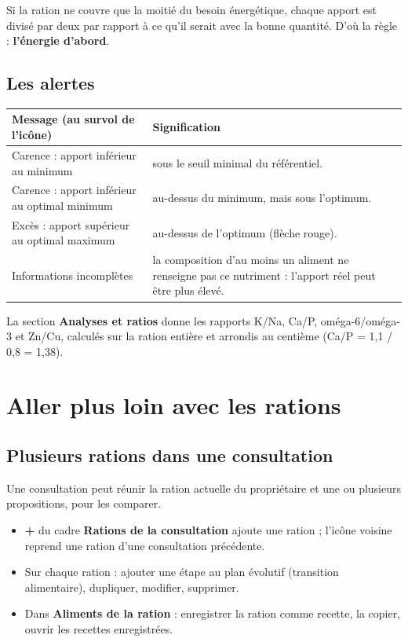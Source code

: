 \documentclass[11pt,a4paper]{article}
\newcommand{\ui}[1]{\textsf{\textbf{#1}}}
\begin{document}
\begin{aretenir}
Si la ration ne couvre que la moitié du besoin énergétique, chaque apport est divisé par deux
par rapport à ce qu'il serait avec la bonne quantité. D'où la règle : \textbf{l'énergie
d'abord}.
\end{aretenir}

\subsection{Les alertes}

\begin{tabularx}{\linewidth}{@{}>{\raggedright\arraybackslash}p{6.2cm} X@{}}
\toprule
\textbf{Message (au survol de l'icône)} & \textbf{Signification} \\
\midrule
Carence : apport inférieur au minimum & sous le seuil minimal du référentiel. \\
Carence : apport inférieur au optimal minimum & au-dessus du minimum, mais sous l'optimum. \\
Excès : apport supérieur au optimal maximum & au-dessus de l'optimum (flèche rouge). \\
Informations incomplètes & la composition d'au moins un aliment ne renseigne pas ce
nutriment : l'apport réel peut être plus élevé. \\
\bottomrule
\end{tabularx}

La section \ui{Analyses et ratios} donne les rapports K/Na, Ca/P, oméga-6/oméga-3 et Zn/Cu,
calculés sur la ration entière et arrondis au centième (Ca/P = 1,1 / 0,8 = 1,38).

\section{Aller plus loin avec les rations}

\subsection{Plusieurs rations dans une consultation}

Une consultation peut réunir la ration actuelle du propriétaire et une ou plusieurs
propositions, pour les comparer.
\begin{itemize}
  \item \ui{+} du cadre \ui{Rations de la consultation} ajoute une ration ; l'icône voisine
        reprend une ration d'une consultation précédente.
  \item Sur chaque ration : ajouter une étape au plan évolutif (transition alimentaire),
        dupliquer, modifier, supprimer.
  \item Dans \ui{Aliments de la ration} : enregistrer la ration comme recette, la copier, ouvrir
        les recettes enregistrées.
\end{itemize}
\end{document}
